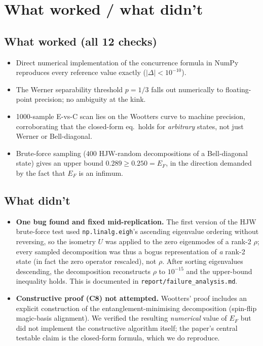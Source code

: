 \documentclass[11pt]{article}
\begin{document}
\section{What worked / what didn't}
\subsection*{What worked (all 12 checks)}
\begin{itemize}
\item Direct numerical implementation of the concurrence formula in
NumPy reproduces every reference value exactly ($|{\Delta}| < 10^{-10}$).
\item The Werner separability threshold $p=1/3$ falls out numerically
to floating-point precision; no ambiguity at the kink.
\item 1000-sample E-vs-C scan lies on the Wootters curve to machine
precision, corroborating that the closed-form eq.\ holds for
\emph{arbitrary} states, not just Werner or Bell-diagonal.
\item Brute-force sampling ($400$ HJW-random decompositions of a
Bell-diagonal state) gives an upper bound $0.289 \ge 0.250 = E_F$, in
the direction demanded by the fact that $E_F$ is an infimum.
\end{itemize}

\subsection*{What didn't}
\begin{itemize}
\item \textbf{One bug found and fixed mid-replication.} The first
version of the HJW brute-force test used
\texttt{np.linalg.eigh}'s ascending eigenvalue ordering without
reversing, so the isometry $U$ was applied to the zero eigenmodes
of a rank-2 $\rho$; every sampled decomposition was thus a bogus
representation of \emph{a} rank-2 state (in fact the zero operator
rescaled), not $\rho$. After sorting eigenvalues descending, the
decomposition reconstructs $\rho$ to $10^{-15}$ and the upper-bound
inequality holds. This is documented in
\texttt{report/failure\_analysis.md}.
\item \textbf{Constructive proof (C8) not attempted.} Wootters'
proof includes an explicit construction of the entanglement-minimising
decomposition (spin-flip magic-basis alignment). We verified the
resulting \emph{numerical} value of $E_F$ but did not implement the
constructive algorithm itself; the paper's central testable claim is
the closed-form formula, which we do reproduce.
\end{itemize}
\end{document}
